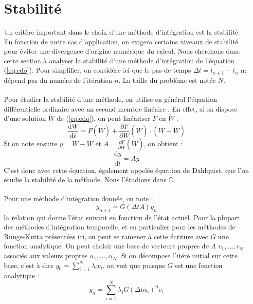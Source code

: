   \section{Stabilité}

    \paragraph{}
    Un critère important dans le choix d'une méthode d'intégration est la stabilité.
    En fonction de notre cas d'application, on exigera certains niveaux de stabilité pour éviter une divergence d'origine numérique du calcul.
    Nous cherchons dans cette section à analyser la stabilité d'une méthode d'intégration de l'équation (\ref{eq:edo}).
    Pour simplifier, on considère ici que le pas de temps $\Delta t = t_{n+1} - t_n$ ne dépend pas du numéro de l'itération $n$.
    La taille du problème est notée $N$.

    \paragraph{}
    Pour étudier la stabilité d'une méthode, on utilise en général l'équation différentielle ordinaire avec un second membre linéaire \cite{HairerWanner1996}.
    En effet, si on dispose d'une solution $\tilde{W}$ de (\ref{eq:edo}), on peut linéariser $F$ en $\tilde{W}$ :
    \[\frac{\mathrm{d}W}{\mathrm{d}t} = F\left(\tilde{W}\right) + \frac{\partial F}{\partial W}\left(\tilde{W}\right)\cdot\left(W - \tilde{W}\right)\]
    Si on note ensuite $y = W - \tilde{W}$ et $A = \frac{\partial F}{\partial W}\left(\tilde{W}\right)$, on obtient :
    \begin{equation}\label{eq:stab}
      \frac{\mathrm{d}y}{\mathrm{d}t} = Ay
    \end{equation}
    C'est donc avec cette équation, également appelée équation de Dahlquist, que l'on étudie la stabilité de la méthode.
    Nous l'étudions dans $\mathbb{C}$.

    \paragraph{}
    Pour une méthode d'intégration donnée, on note :
    \begin{equation}\label{eq:stab_req}
      y_{n+1} = G\left(\Delta tA\right)y_n
    \end{equation}
    la relation qui donne l'état suivant en fonction de l'état actuel.
    Pour la plupart des méthodes d'intégration temporelle, et en particulier pour les méthodes de Runge-Kutta présentées ici, on peut se ramener à cette écriture avec $G$ une fonction analytique.
    On peut choisir une base de vecteurs propres de $A$ $v_1, \dots, v_N$ associés aux valeurs propres $\alpha_1, \dots, \alpha_N$.
    Si on décompose l'itéré initial sur cette base, c'est à dire $y_0 = \sum_{i=1}^N\lambda_iv_i$, on voit que puisque $G$ est une fonction analytique :
    \[y_n = \sum_{i=1}^N\lambda_iG\left(\Delta t\alpha_i\right)^nv_i\]

